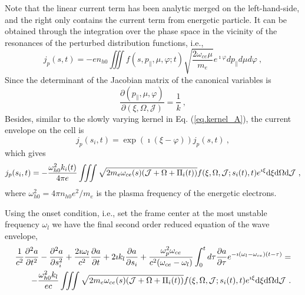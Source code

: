 Note that the linear current term has been analytic merged on the left-hand-side, and the right only contains the current term from energetic particle. It can be obtained through the integration over the phase space in the vicinity of the resonances of the perturbed distribution functions, i.e.,
\begin{equation}
    j_p(s, t)=-e n_{h 0} \iiint f\left(s, p_{\parallel}, \mu, \varphi ; t\right) \sqrt{\frac{2 \omega_{ce} \mu}{m_{e}}} e^{\imath \varphi} d p_{\parallel} d \mu d \varphi~,
\end{equation}
Since the determinant of the Jacobian matrix of the canonical variables is 
\begin{equation}
    \frac{\partial (p_\|,\mu,\varphi)}{\partial (\xi,\Omega,\mathcal{J})} = \frac{1}{k}~,
\end{equation}
Besides, similar to the slowly varying kernel in Eq. (\ref{eq.kernel_A}), the current envelope on the cell is
\begin{equation}
j_{p}(s_i,t) = \exp(\imath(\xi-\varphi))j_{p}(s,t)~,
\end{equation}
which gives
\begin{equation}\label{eq.nonlinear_J}
    j_p(s_i,t) = - \frac{\omega_{h0}^2k_i(t)}{4\pi e}\iiint \sqrt{2m_e\omega_{ce}(s)(\mathcal{J}+\Omega+\Pi_i(t))}f(\xi,\Omega,\mathcal{J};s_i(t),t)e^{\imath \xi} \rm d \xi \rm d \Omega \rm d \mathcal{J}~,
\end{equation}
where $\omega^2_{h0} = 4 \pi n_{h0} e^2 /m_e$ is the plasma frequency of the energetic electrons.

Using the onset condition, i.e., set the frame center at the most unstable frequency $\omega_l$ we have the final second order reduced equation of the wave envelope, 
\begin{equation}\label{eq.wave_2nd}
    \begin{aligned}
    \frac{1}{c^2}\frac{\partial^2 a}{\partial t^2} - \frac{\partial^2 a}{\partial s_i^2} + \frac{2\imath\omega_l}{c^2}\frac{\partial a}{\partial t} + 2\imath k_l\frac{\partial a}{\partial s_i} + \frac{\omega_p^2 \omega_{c e}}{c^2(\omega_{c e}-\omega_l)} \int_0^t d \tau \frac{\partial a}{\partial \tau} e^{-\imath\left(\omega_l-\omega_{c e}\right)(t-\tau)} = 
    \\
    - \frac{\omega_{h0}^2k_l}{ec}\iiint \sqrt{2m_e\omega_{ce}(s)(\mathcal{J}+\Omega+\Pi_i(t))}f(\xi,\Omega,\mathcal{J};s_i(t),t)e^{\imath \xi} \rm d \xi \rm d \Omega \rm d \mathcal{J}~.    
    \end{aligned}
\end{equation}

